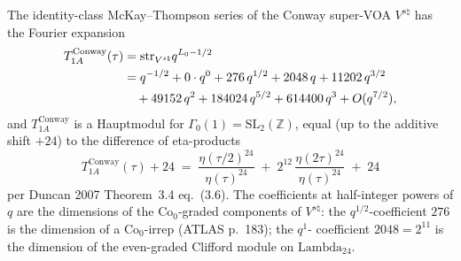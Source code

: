 \begin{theorem}%
\label{thm:bkm-conway-identity-class}%
%
%
The identity-class McKay--Thompson series of the Conway super-VOA
$V^{s\natural}$ has the Fourier expansion
\begin{align}
 T_{1A}^{\mathrm{Conway}}(\tau)
 &= \mathrm{str}_{V^{s\natural}} q^{L_0 - 1/2}
 \notag \\
 &= q^{-1/2} + 0 \cdot q^{0} + 276\, q^{1/2} + 2048\, q + 11202\, q^{3/2}
 \notag \\
 &\quad + 49152\, q^{2} + 184024\, q^{5/2} + 614400\, q^{3}
 + O(q^{7/2}),
\label{eq:bkm-conway-T1A-fourier}
\end{align}
and $T_{1A}^{\mathrm{Conway}}$ is a Hauptmodul for
$\Gamma_0(1) = \mathrm{SL}_2(\mathbb{Z})$, equal (up to the additive
shift $+24$) to the difference of eta-products
\[
 T_{1A}^{\mathrm{Conway}}(\tau) + 24
 \;=\;
 \frac{\eta(\tau/2)^{24}}{\eta(\tau)^{24}}
 \;+\;
 2^{12}\,\frac{\eta(2\tau)^{24}}{\eta(\tau)^{24}}
 \;+\;
 24
\]
per Duncan 2007 Theorem~3.4 eq.~(3.6). The coefficients at half-integer
powers of $q$ are the dimensions of the $\mathrm{Co}_0$-graded
components of $V^{s\natural}$: the $q^{1/2}$-coefficient $276$ is the
dimension of a $\mathrm{Co}_0$-irrep (ATLAS p.~183); the $q^{1}$-
coefficient $2048 = 2^{11}$ is the dimension of the even-graded
Clifford module on $\mathrm{Lambda}_{24}$.
\end{theorem}

